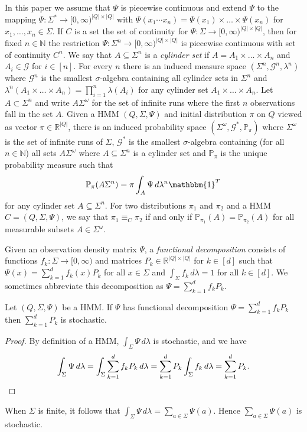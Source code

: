 \documentclass[a4paper,UKenglish,cleveref, autoref,mathscr]{lipics-v2019}
\newcommand{\RR}{\mathbb{R}}
\newcommand{\NN}{\mathbb{N}}
\newcommand{\PP}{\mathbb{P}}
\newcommand{\GG}{\mathscr{G}}
\newcommand{\1}{\mathbbm{1}}
\begin{document}
In this paper we assume that $\Psi$ is piecewise continuous and extend $\Psi$ to the mapping $\Psi : \Sigma^* \rightarrow [0,\infty)^{|Q| \times |Q|}$ with $\Psi(x_1 \cdots x_n) = \Psi(x_1) \times \dots \times \Psi(x_n)$ for $x_1, \dots, x_n \in \Sigma$. If $C$ is a set the set of continuity for $\Psi : \Sigma \rightarrow [0,\infty)^{|Q| \times |Q|}$, then for fixed $n \in \NN$ the restriction $\Psi : \Sigma^n \rightarrow [0,\infty)^{|Q| \times |Q|}$ is piecewise continuous with set of continuity $C^n$. We say that $A \subseteq \Sigma^n$ is a \emph{cylinder set} if $A = A_1 \times \dots \times A_n$ and $A_i \in \GG$ for $i \in [n]$. For every $n$ there is an induced measure space $(\Sigma^n, \GG^n, \lambda^n)$ where $\GG^n$ is the smallest $\sigma$-algebra containing all cylinder sets in $\Sigma^n$ and $\lambda^n(A_1 \times \dots \times A_n) = \prod_{i = 1}^n \lambda(A_i)$ for any cylinder set $A_1 \times \dots \times A_n$. Let $A \subset \Sigma^n$ and write $A \Sigma^\omega$ for the set of infinite runs where the first $n$ observations fall in the set $A$. Given a HMM $(Q, \Sigma, \Psi)$ and initial distribution $\pi$ on $Q$ viewed as vector $\pi \in \RR^{|Q|}$, there is an induced probability space $(\Sigma^\omega, \GG^*, \PP_\pi)$ where $\Sigma^\omega$ is the set of infinite runs of $\Sigma$, $\GG^*$ is the smallest $\sigma$-algebra containing (for all $n \in \NN$) all sets $A \Sigma^\omega$ where $A\subseteq \Sigma^n$ is a cylinder set and $\PP_\pi$ is the unique probability measure such that
\[\PP_\pi(A \Sigma^n) =  \pi \int_A \Psi\, d\lambda^n \1^T\]
for any cylinder set $A \subseteq \Sigma^n$. For two distributions $\pi_1$ and $\pi_2$ and a HMM $C = (Q, \Sigma, \Psi)$, we say that $\pi_1 \equiv_C \pi_2$ if and only if $\PP_{\pi_1}(A) = \PP_{\pi_2}(A)$ for all measurable subsets $A \in \Sigma^\omega$.


Given an observation density matrix $\Psi$, a \emph{functional decomposition} consists of functions $f_k : \Sigma \rightarrow [0,\infty)$ and matrices $P_k \in \RR^{|Q| \times |Q|}$ for $k \in [d]$ such that $\Psi(x) = \sum_{k = 1}^d f_k(x) P_k$ for all $x \in \Sigma$ and $\int_{\Sigma} f_k\, d\lambda = 1$ for all $k \in [d]$. We sometimes abbreviate this decomposition as $\Psi = \sum_{k = 1}^d f_k P_k$.

\begin{lemma}\label{stochasticPk}
Let $(Q, \Sigma, \Psi)$ be a HMM.
If $\Psi$ has functional decomposition $\Psi =  \sum_{k = 1}^d f_k P_k$ then $\sum_{k = 1}^d P_k$ is stochastic.
\end{lemma}
\begin{proof}
By definition of a HMM, $\int_{\Sigma} \Psi\, d\lambda$ is stochastic, and we have
\begin{equation*}
\int_{\Sigma} \Psi\, d\lambda = \int_{\Sigma} \sum_{k = 1}^d f_k P_k\, d\lambda =  \sum_{k = 1}^d P_k  \int_{\Sigma} f_k\, d\lambda =  \sum_{k = 1}^d P_k.\qedhere
\end{equation*}
\end{proof}
When $\Sigma$ is finite, it follows that $\int_\Sigma \Psi\, d\lambda = \sum_{a \in \Sigma} \Psi(a)$. Hence $\sum_{a \in \Sigma} \Psi(a)$ is stochastic.
\end{document}
